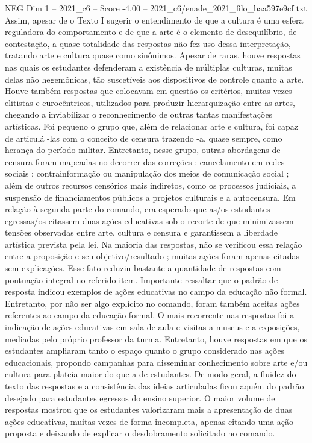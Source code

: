 \begin{textsample}{NEG Dim 1 – 2021\_c6 – Score -4.00 – 2021\_c6/enade\_2021\_filo\_baa597e9cf.txt}
Assim, apesar de o Texto I sugerir o entendimento de que a cultura é uma esfera reguladora do comportamento e de que a arte é o elemento de desequilíbrio, de contestação, a quase totalidade das respostas não fez uso dessa interpretação, tratando arte e cultura quase como sinônimos.
Apesar de raras, houve respostas nas quais os estudantes defenderam a existência de múltiplas culturas, muitas delas não hegemônicas, tão suscetíveis aos dispositivos de controle quanto a arte.
Houve também respostas que colocavam em questão os critérios, muitas vezes elitistas e eurocêntricos, utilizados para produzir hierarquização entre as artes, chegando a inviabilizar o reconhecimento de outras tantas manifestações artísticas.
Foi pequeno o grupo que, além de relacionar arte e cultura, foi capaz de articulá -las com o conceito de censura trazendo -a, quase sempre, como herança do período militar.
Entretanto, nesse grupo, outras abordagens de censura foram mapeadas no decorrer das correções : cancelamento em redes sociais ; contrainformação ou manipulação dos meios de comunicação social ; além de outros recursos censórios mais indiretos, como os processos judiciais, a suspensão de financiamentos públicos a projetos culturais e a autocensura.
Em relação à segunda parte do comando, era esperado que as/os estudantes egressas/os citassem duas ações educativas sob o recorte de que minimizassem tensões observadas entre arte, cultura e censura e garantissem a liberdade artística prevista pela lei.
Na maioria das respostas, não se verificou essa relação entre a proposição e seu objetivo/resultado ; muitas ações foram apenas citadas sem explicações.
Esse fato reduziu bastante a quantidade de respostas com pontuação integral no referido item.
Importante ressaltar que o padrão de resposta indicou exemplos de ações educativas no campo da educação não formal.
Entretanto, por não ser algo explícito no comando, foram também aceitas ações referentes ao campo da educação formal.
O mais recorrente nas respostas foi a indicação de ações educativas em sala de aula e visitas a museus e a exposições, mediadas pelo próprio professor da turma.
Entretanto, houve respostas em que os estudantes ampliaram tanto o espaço quanto o grupo considerado nas ações educacionais, propondo campanhas para disseminar conhecimento sobre arte e/ou cultura para plateia maior do que a de estudantes.
De modo geral, a fluidez do texto das respostas e a consistência das ideias articuladas ficou aquém do padrão desejado para estudantes egressos do ensino superior.
O maior volume de respostas mostrou que os estudantes valorizaram mais a apresentação de duas ações educativas, muitas vezes de forma incompleta, apenas citando uma ação proposta e deixando de explicar o desdobramento solicitado no comando.

\end{textsample}
